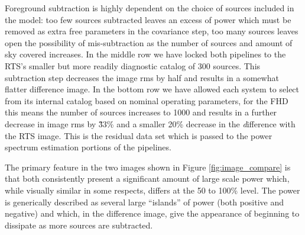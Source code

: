 \documentclass[preprint]{aastex}
\begin{document}
Foreground subtraction is highly dependent on the choice of sources included in the model: too few sources subtracted leaves an excess of power which must be removed as extra free parameters in the covariance step, too many sources leaves open the possibility of mis-subtraction as the number of sources and amount of sky covered increases. In the middle row we have locked both pipelines to the RTS's smaller but more readily diagnostic catalog of 300 sources.  This subtraction step decreases the image rms by half and results in a somewhat flatter difference image.  In the bottom row we have allowed each system to select from its internal catalog based on nominal operating parameters, for the FHD this means the number of sources increases to 1000 and results in a further decrease in image rms by \~33\% and a smaller 20\% decrease in the {\emph difference} with the RTS image.   This is the residual data set which is passed to the power spectrum estimation portions of the pipelines.

   The primary feature in the two images shown in Figure \ref{fig:image_compare} is that both consistently present a significant amount of large scale power which, while visually similar in some respects, differs at the 50 to 100\% level.  The power is generically described as several large ``islands'' of power (both positive and negative) and which, in the difference image, give the appearance of beginning to dissipate as more sources are subtracted.  
\end{document}
